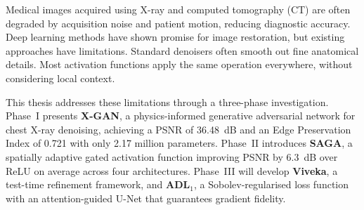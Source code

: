 
Medical images acquired using X-ray and computed tomography (CT) are often
degraded by acquisition noise and patient motion, reducing diagnostic accuracy.
Deep learning methods have shown promise for image restoration, but existing
approaches have limitations. Standard denoisers often smooth out fine anatomical
details. Most activation functions apply the same operation everywhere, without
considering local context.

This thesis addresses these limitations through a three-phase investigation.
Phase~I presents \textbf{X-GAN}, a physics-informed generative adversarial
network for chest X-ray denoising, achieving a PSNR of 36.48~dB and an Edge
Preservation Index of 0.721 with only 2.17 million parameters. Phase~II
introduces \textbf{SAGA}, a spatially adaptive gated activation function
improving PSNR by 6.3~dB over ReLU on average across four architectures.
Phase~III will develop \textbf{Viveka}, a test-time refinement framework,
and \textbf{ADL$_1$}, a Sobolev-regularised loss function with an
attention-guided U-Net that guarantees gradient fidelity.
